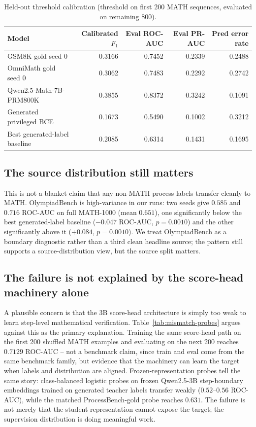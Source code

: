 \documentclass[11pt]{article}
\begin{document}
\begin{table}[t]
\centering
\small
\begin{tabular}{lrrrr}
\toprule
Model & Calibrated $F_1$ & Eval ROC-AUC & Eval PR-AUC & Pred error rate \\
\midrule
GSM8K gold seed 0 & 0.3166 & 0.7452 & 0.2339 & 0.2488 \\
OmniMath gold seed 0 & 0.3062 & 0.7483 & 0.2292 & 0.2742 \\
Qwen2.5-Math-7B-PRM800K & 0.3855 & 0.8372 & 0.3242 & 0.1091 \\
Generated privileged BCE & 0.1673 & 0.5490 & 0.1002 & 0.3212 \\
Best generated-label baseline & 0.2085 & 0.6314 & 0.1431 & 0.1695 \\
\bottomrule
\end{tabular}
\caption{Held-out threshold calibration (threshold on first 200 MATH
sequences, evaluated on remaining 800).}
\label{tab:mismatch-calibration}
\end{table}

\subsection{The source distribution still matters}
This is not a blanket claim that any non-MATH process labels transfer
cleanly to MATH. OlympiadBench is high-variance in our runs: two seeds give
$0.585$ and $0.716$ ROC-AUC on full MATH-1000 (mean $0.651$), one
significantly below the best generated-label baseline
($-0.047$ ROC-AUC, $p=0.0010$) and the other significantly above it
($+0.084$, $p=0.0010$). We treat OlympiadBench as a boundary diagnostic
rather than a third clean headline source; the pattern still supports a
source-distribution view, but the source split matters.

\subsection{The failure is not explained by the score-head machinery alone}
\label{sec:mismatch-probes}
A plausible concern is that the 3B score-head architecture is simply too
weak to learn step-level mathematical verification. Table~\ref{tab:mismatch-probes}
argues against this as the primary explanation. Training the same score-head
path on the first 200 shuffled MATH examples and evaluating on the next 200
reaches $0.7129$ ROC-AUC -- not a benchmark claim, since train and eval come
from the same benchmark family, but evidence that the machinery can learn
the target when labels and distribution are aligned. Frozen-representation
probes tell the same story: class-balanced logistic probes on frozen
Qwen2.5-3B step-boundary embeddings trained on generated teacher labels
transfer weakly ($0.52$--$0.56$ ROC-AUC), while the matched
ProcessBench-gold probe reaches $0.631$. The failure is not merely that the
student representation cannot expose the target; the supervision
distribution is doing meaningful work.
\end{document}
